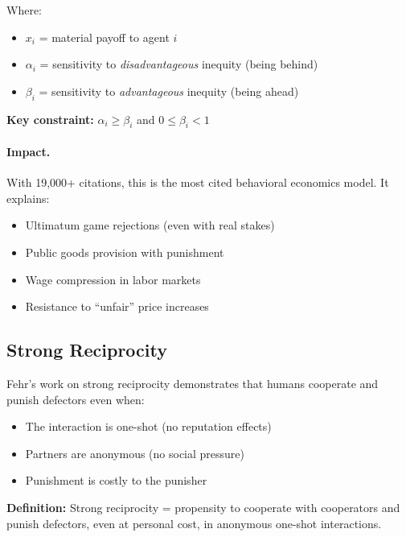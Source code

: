 Where:
\begin{itemize}[nosep]
    \item $x_i$ = material payoff to agent $i$
    \item $\alpha_i$ = sensitivity to \textit{disadvantageous} inequity (being behind)
    \item $\beta_i$ = sensitivity to \textit{advantageous} inequity (being ahead)
\end{itemize}

\textbf{Key constraint:} $\alpha_i \geq \beta_i$ and $0 \leq \beta_i < 1$

\paragraph{Impact.} With 19,000+ citations, this is the most cited behavioral
economics model. It explains:
\begin{itemize}[nosep]
    \item Ultimatum game rejections (even with real stakes)
    \item Public goods provision with punishment
    \item Wage compression in labor markets
    \item Resistance to ``unfair'' price increases
\end{itemize}

\subsection{Strong Reciprocity}
\label{sec:feh-reciprocity}

Fehr's work on strong reciprocity \citep{fehr2002strong, fehr2002altruistic}
demonstrates that humans cooperate and punish defectors even when:
\begin{itemize}[nosep]
    \item The interaction is one-shot (no reputation effects)
    \item Partners are anonymous (no social pressure)
    \item Punishment is costly to the punisher
\end{itemize}

\textbf{Definition:} Strong reciprocity = propensity to cooperate with cooperators
and punish defectors, even at personal cost, in anonymous one-shot interactions.

